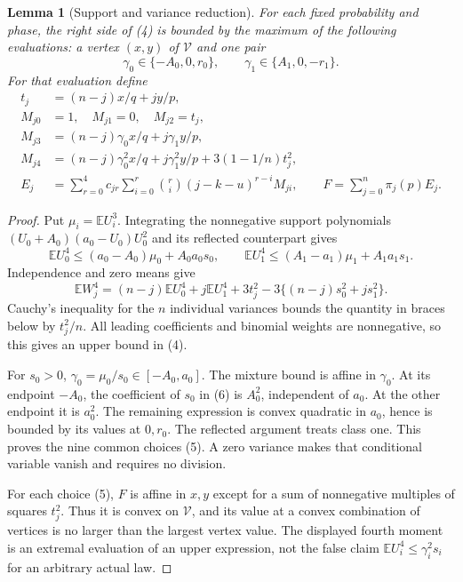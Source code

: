 \documentclass[11pt,a4paper]{article}
\newcommand{\E}{\mathbb E}
\newtheorem{lemma}[proposition]{Lemma}
\begin{document}
\begin{lemma}[Support and variance reduction]
For each fixed probability and phase, the right side of (4) is bounded
by the maximum of the following evaluations: a vertex $(x,y)$ of
$\mathcal V$ and one pair
\[
 \gamma_0\in\{-A_0,0,r_0\},\qquad
 \gamma_1\in\{A_1,0,-r_1\}.
 \tag{5}
\]
For that evaluation define
\begin{align*}
 t_j&=(n-j)x/q+jy/p,\\
 M_{j0}&=1,\quad M_{j1}=0,\quad M_{j2}=t_j,\\
 M_{j3}&=(n-j)\gamma_0x/q+j\gamma_1y/p,\\
 M_{j4}&=(n-j)\gamma_0^2x/q+j\gamma_1^2y/p
             +3(1-1/n)t_j^2,\\
 E_j&=\sum_{r=0}^4c_{jr}\sum_{i=0}^r
                \binom ri(j-k-u)^{r-i}M_{ji},\qquad
 F=\sum_{j=0}^n\pi_j(p)E_j.
\end{align*}
\end{lemma}
\begin{proof}
Put $\mu_i=\E U_i^3$. Integrating the nonnegative support polynomials
$(U_0+A_0)(a_0-U_0)U_0^2$ and its reflected counterpart gives
\[
 \E U_0^4\le(a_0-A_0)\mu_0+A_0a_0s_0,\qquad
 \E U_1^4\le(A_1-a_1)\mu_1+A_1a_1s_1.
 \tag{6}
\]
Independence and zero means give
\[
 \E W_j^4=(n-j)\E U_0^4+j\E U_1^4
       +3t_j^2-3\{(n-j)s_0^2+js_1^2\}.
\]
Cauchy's inequality for the $n$ individual variances bounds the
quantity in braces below by $t_j^2/n$. All leading coefficients
and binomial weights are nonnegative, so this gives an upper bound
in (4).

For $s_0>0$, $\gamma_0=\mu_0/s_0\in[-A_0,a_0]$.
The mixture bound is affine in $\gamma_0$. At its endpoint $-A_0$,
the coefficient of $s_0$ in (6) is $A_0^2$, independent of $a_0$.
At the other endpoint it is $a_0^2$. The remaining expression is
convex quadratic in $a_0$, hence is bounded by its values at
$0,r_0$. The reflected argument treats class one. This proves
the nine common choices (5). A zero variance makes that conditional
variable vanish and requires no division.

For each choice (5), $F$ is affine in $x,y$ except for a sum of
nonnegative multiples of squares $t_j^2$. Thus it is convex on
$\mathcal V$, and its value at a convex combination of vertices
is no larger than the largest vertex value. The displayed fourth
moment is an extremal evaluation of an upper expression, not the
false claim $\E U_i^4\le\gamma_i^2s_i$ for an arbitrary actual law.
\end{proof}
\end{document}
